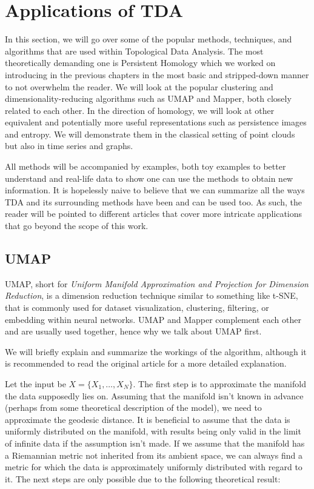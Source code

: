 \chapter{Applications of TDA}
\graphicspath{ {/home/tomasp/Dokumenty/Master_Thesis/figures/} }

In this section, we will go over some of the popular methods, techniques, and algorithms that are used within Topological Data Analysis. The most theoretically demanding one is Persistent Homology which we worked on introducing in the previous chapters in the most basic and stripped-down manner to not overwhelm the reader. We will look at the popular clustering and dimensionality-reducing algorithms such as UMAP and Mapper, both closely related to each other. In the direction of homology, we will look at other equivalent and potentially more useful representations such as persistence images and entropy. We will demonstrate them in the classical setting of point clouds but also in time series and graphs.

All methods will be accompanied by examples, both toy examples to better understand and real-life data to show one can use the methods to obtain new information. It is hopelessly naive to believe that we can summarize all the ways TDA and its surrounding methods have been and can be used too. As such, the reader will be pointed to different articles that cover more intricate applications that go beyond the scope of this work.

\section{UMAP}
UMAP, short for \textit{Uniform Manifold Approximation and Projection for Dimension Reduction}, is a dimension reduction technique similar to something like t-SNE, that is commonly used for dataset visualization, clustering, filtering, or embedding within neural networks. UMAP and Mapper complement each other and are usually used together, hence why we talk about UMAP first.

We will briefly explain and summarize the workings of the algorithm, although it is recommended to read the original article \cite{mcinnes2020umapuniformmanifoldapproximation} for a more detailed explanation.

Let the input be $X = \{X_{1}, \ldots, X_{N}\}$. The first step is to approximate the manifold the data supposedly lies on. Assuming that the manifold isn't known in advance (perhaps from some theoretical description of the model), we need to approximate the geodesic distance. It is beneficial to assume that the data is uniformly distributed on the manifold, with results being only valid in the limit of infinite data if the assumption isn't made. If we assume that the manifold has a Riemannian metric not inherited from its ambient space, we can always find a metric for which the data is approximately uniformly distributed with regard to it. The next steps are only possible due to the following theoretical result:

